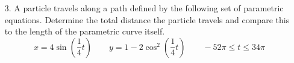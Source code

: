 \documentclass[12pt]{article}
\begin{document}
\begin{enumerate}[label=\arabic*.]
\begin{proof}[Solution]
\begin{align*}
					& = \left[\frac{8}{63}u^{\frac{3}{2}}\right]_0^4 \\
					& = \left[\frac{8}{63}\left(\frac{63}{4}t+2\right)^{\frac{3}{2}}\right]_0^4 
				\end{align*}
				evaluate,
				\begin{align*}
					L & =  \int_0^4 \sqrt{\left(12t^{\frac{1}{2}}\right)^2+\left(-\frac{3}{2}(8-t)^{\frac{1}{2}}\right)^2}~dt  = \left[\frac{8}{63}\left(\frac{63}{4}t+2\right)^{\frac{3}{2}}\right]_0^4 \\
					& = \left[\frac{8}{63}\left(\frac{63}{4}(4)+2\right)^{\frac{3}{2}}\right]-\left[\frac{8}{63}\left(\frac{63}{4}(0)+2\right)^{\frac{3}{2}}\right] \\
					& = \left[\frac{8}{63}(65)^{\frac{3}{2}}\right]-\left[\frac{8}{63}(2)^{\frac{3}{2}}\right] \\
					& = \frac{8}{63}\left((65)^{\frac{3}{2}}-(2)^{\frac{3}{2}}\right) \\
					& = \frac{8}{63}\left(\sqrt{(65)^3}-\sqrt{(2)^3}\right) \\
					& = \boxed{ \frac{8}{63}\left(\sqrt{274625}-\sqrt{8}\right) \approx 66.18645416}
				\end{align*}
				$\therefore$ The length of the parametric curve is \(66.19\) units in a given range of \(0\leq t\leq 4\)
			\end{proof}
			\hrule
			
			\item[3.] A particle travels along a path defined by the following set of parametric equations. Determine the total distance the particle travels and compare this to the length of the parametric curve itself.
			\[x=4\sin \left(\frac{1}{4}t\right) \qquad y=1-2\cos ^2 \left(\frac{1}{4}t\right) \qquad -52\pi \leq t \leq 34\pi\]
			

\end{enumerate}
\end{document}

